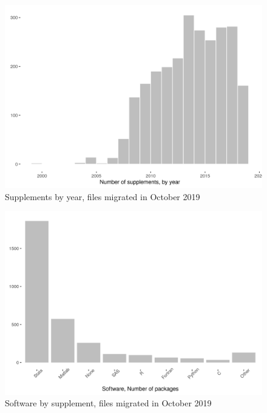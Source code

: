 \documentclass[PP]{AEA}
\begin{document}
\begin{figure}
    \centering
    \includegraphics[height=0.4\textheight]{images/figure_migration_doi_by_year.png}
    \caption{Supplements by year, files migrated in October 2019}
    \label{fig:migration_doi_by_year}
\end{figure}

\begin{figure}
    \centering
    \includegraphics[height=0.4\textheight]{images/figure_migration_software_pkgs.png}
    \caption{Software by supplement, files migrated in October 2019}
    \label{fig:migration_software_pkgs}
\end{figure}


\end{document}
